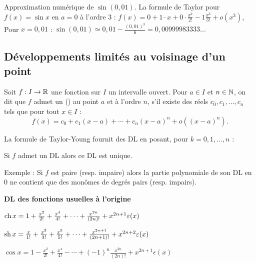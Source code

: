 \documentclass[10pt,class=article,crop=false]{standalone}
\begin{document}
\begin{multicols}{2}


Approximation numérique de $\sin(0,01)$.
La formule de Taylor pour $f(x)=\sin x$ en $a=0$ à l'ordre $3$  :
$f(x)=0+1\cdot x +0\cdot \frac{x^2}{2!}-1\frac{x^3}{3!} + o(x^3)$,
Pour $x=0,01$ :
$\sin(0,01) \simeq 0,01 - \frac{(0,01)^3}{6}=0,00999983333\ldots$
	





\subsection{Développements limités au voisinage d'un point}

Soit $f : I \to \mathbb{R}$ une fonction sur $I$ un intervalle ouvert.
Pour $a\in I$ et $n\in \mathbb{N}$, on dit que $f$ admet un
 () au point $a$ et à l'ordre $n$, s'il existe
des réels $c_0, c_1,\ldots,c_n$ tels que pour tout $x\in I$ :
$$f(x)=c_0+c_1 (x-a)+\cdots+c_n(x-a)^n+o((x-a)^n).$$

La formule de Taylor-Young fournit des DL
en posant, pour $k=0,1,\ldots,n$ :


\begin{proposition}
Si $f$ admet un DL alors ce DL est unique.
\end{proposition}

Exemple : Si $f$ est paire (resp. impaire) alors la partie polynomiale de son DL en $0$
ne contient que des monômes de degrés pairs (resp. impairs).


\textbf{DL des fonctions usuelles à l'origine}

\begin{center}

\smallskip

$\operatorname{ch} x=1+\frac{x^2}{2!}+\frac{x^4}{4!}+\cdots+\frac{x^{2n}}{(2n)!}
+x^{2n+1}\varepsilon(x)$

\smallskip

$\operatorname{sh} x=\frac{x}{1!}+\frac{x^3}{3!}+\frac{x^5}{5!}+\cdots
+\frac{x^{2n+1}}{(2n+1)!}
+x^{2n+2}\varepsilon(x)$

\smallskip

$\cos x=1-\frac{x^2}{2!}+\frac{x^4}{4!}-\cdots+(-1)^n\frac{x^{2n}}{(2n)!}
+x^{2n+1}\epsilon(x)$


\end{center}
\end{multicols}
\end{document}
